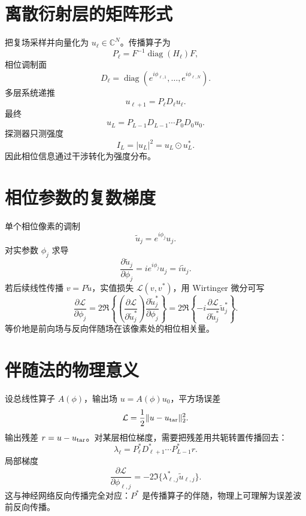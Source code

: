 \documentclass[UTF8,12pt,a4paper,fontset=none]{ctexart}
\numberwithin{equation}{section}
\newcommand{\Loss}{\mathcal{L}}
\begin{document}
\section{离散衍射层的矩阵形式}
把复场采样并向量化为 $u_\ell\in\mathbb C^N$。传播算子为
\begin{equation}
 P_\ell=F^{-1}\operatorname{diag}(H_\ell)F,
\end{equation}
相位调制面
\begin{equation}
 D_\ell=\operatorname{diag}(e^{i\phi_{\ell,1}},\ldots,e^{i\phi_{\ell,N}}).
\end{equation}
多层系统递推
\begin{equation}
 u_{\ell+1}=P_\ell D_\ell u_\ell.
\end{equation}
最终
\begin{equation}
 u_L=P_{L-1}D_{L-1}\cdots P_0D_0u_0.
\end{equation}
探测器只测强度
\begin{equation}
 I_L=|u_L|^2=u_L\odot u_L^*.
\end{equation}
因此相位信息通过干涉转化为强度分布。

\section{相位参数的复数梯度}
单个相位像素的调制
\begin{equation}
 \widetilde u_j=e^{i\phi_j}u_j.
\end{equation}
对实参数 $\phi_j$ 求导
\begin{equation}
 \frac{\partial\widetilde u_j}{\partial\phi_j}
 =i e^{i\phi_j}u_j=i\widetilde u_j.
\end{equation}
若后续线性传播 $v=P\widetilde u$，实值损失 $\Loss(v,v^*)$，用 Wirtinger 微分可写
\begin{equation}
 \frac{\partial\Loss}{\partial\phi_j}
 =2\Re\left\{
 \left(\frac{\partial\Loss}{\partial\widetilde u_j^*}\right)
 \frac{\partial\widetilde u_j^*}{\partial\phi_j}
 \right\}
 =2\Re\left\{-i
 \frac{\partial\Loss}{\partial\widetilde u_j^*}
 \widetilde u_j^*\right\}.
\end{equation}
等价地是前向场与反向伴随场在该像素处的相位相关量。

\section{伴随法的物理意义}
设总线性算子 $A(\phi)$，输出场 $u=A(\phi)u_0$，平方场误差
\begin{equation}
 \Loss=\frac12\|u-u_{\rm tar}\|_2^2.
\end{equation}
输出残差 $r=u-u_{\rm tar}$。对某层相位梯度，需要把残差用共轭转置传播回去：
\begin{equation}
 \lambda_\ell=P_\ell^*D_{\ell+1}^*\cdots P_{L-1}^*r.
\end{equation}
局部梯度
\begin{equation}
 \frac{\partial\Loss}{\partial\phi_{\ell,j}}
 =-2\Im\{\lambda_{\ell,j}^*\widetilde u_{\ell,j}\}.
\end{equation}
这与神经网络反向传播完全对应：$P^*$ 是传播算子的伴随，物理上可理解为误差波前反向传播。
\end{document}
